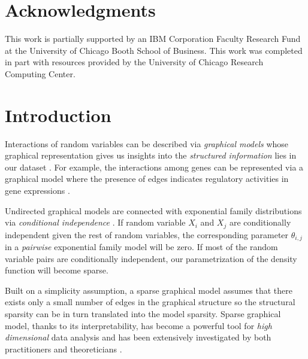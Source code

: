 \documentclass[11pt]{article}
\title{}
\author{}
\date{First draft: ...}
\numberwithin{equation}{section}
\numberwithin{theorem}{section}
\theoremstyle{definition}
\theoremstyle{remark}
\begin{document}
\maketitle

\begin{abstract}
\end{abstract}


\newpage

\section*{Acknowledgments}

This work is partially supported by an IBM Corporation Faculty
Research Fund at the University of Chicago Booth School of Business.
This work was completed in part with resources provided by the
University of Chicago Research Computing Center.

\newpage

\section{Introduction}

Interactions of random variables can be described via \textit{graphical models} whose graphical representation gives us insights into the \emph{structured information} lies in our dataset \cite{Koller2009Probabilistic,Mackay2003}. For example, the interactions among genes can be represented via a graphical model where the presence of edges indicates regulatory activities in gene expressions \cite{Hartemink2000,Dobra2004}.

Undirected graphical models are connected with exponential family distributions via \emph{conditional independence} \cite{Hammersley1971}. If random variable $X_i$ and  $X_j$ are conditionally independent given the rest of random variables, the corresponding parameter $\theta_{i,j}$ in a \emph{pairwise} exponential family model will be zero. If most of the random variable pairs are conditionally independent, our parametrization of the density function will become sparse.


Built on a simplicity assumption, a sparse graphical model assumes that there exists only a small number of edges in the graphical structure so the structural sparsity can be in turn translated into the model sparsity. Sparse graphical model, thanks to its interpretability, has become a powerful tool for \emph{high dimensional} data analysis and has been extensively investigated by both practitioners and theoreticians \cite{Friedman2008Sparse,ravikumar09high}.
\end{document}
